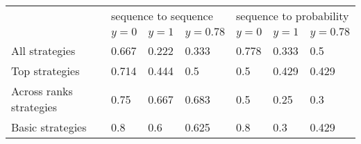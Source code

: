 \begin{tabular}{lllllll}
\toprule
{} & \multicolumn{3}{l}{sequence to sequence} & \multicolumn{3}{l}{sequence to probability} \\
{} &                         $y=0$ &                         $y=1$ &                      $y=0.78$ &                         $y=0$ &                         $y=1$ &                      $y=0.78$ \\
\midrule
All strategies          &  \cellcolor{orange!67.0}0.667 &  \cellcolor{orange!22.0}0.222 &  \cellcolor{orange!33.0}0.333 &  \cellcolor{orange!78.0}0.778 &  \cellcolor{orange!33.0}0.333 &    \cellcolor{orange!50.0}0.5 \\
Top strategies          &  \cellcolor{orange!71.0}0.714 &  \cellcolor{orange!44.0}0.444 &    \cellcolor{orange!50.0}0.5 &    \cellcolor{orange!50.0}0.5 &  \cellcolor{orange!43.0}0.429 &  \cellcolor{orange!43.0}0.429 \\
Across ranks strategies &   \cellcolor{orange!75.0}0.75 &  \cellcolor{orange!67.0}0.667 &  \cellcolor{orange!68.0}0.683 &    \cellcolor{orange!50.0}0.5 &   \cellcolor{orange!25.0}0.25 &    \cellcolor{orange!30.0}0.3 \\
Basic strategies        &    \cellcolor{orange!80.0}0.8 &    \cellcolor{orange!60.0}0.6 &  \cellcolor{orange!62.0}0.625 &    \cellcolor{orange!80.0}0.8 &    \cellcolor{orange!30.0}0.3 &  \cellcolor{orange!43.0}0.429 \\
\bottomrule
\end{tabular}
